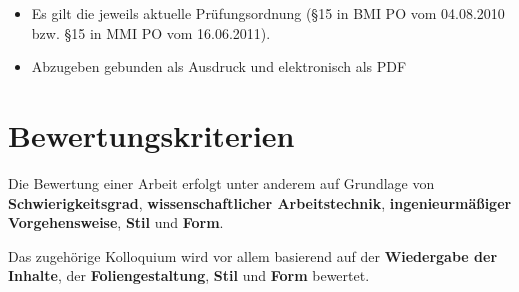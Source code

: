 \begin{itemize}
 \item Es gilt die jeweils aktuelle Pr\"ufungsordnung (\S 15 in BMI PO vom 04.08.2010 bzw. \S 15 in MMI PO vom 16.06.2011).
 \item Abzugeben gebunden als Ausdruck und elektronisch als PDF
\end{itemize}

\section{Bewertungskriterien}

Die Bewertung einer Arbeit erfolgt unter anderem auf Grundlage von \textbf{Schwierigkeitsgrad}, \textbf{wissenschaftlicher Arbeitstechnik}, \textbf{ingenieurmäßiger Vorgehensweise}, \textbf{Stil} und \textbf{Form}.

\noindent
Das zugehörige Kolloquium wird vor allem basierend auf der \textbf{Wiedergabe der Inhalte}, der \textbf{Foliengestaltung}, \textbf{Stil} und \textbf{Form} bewertet.